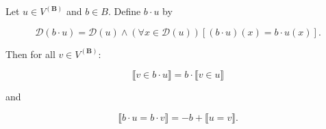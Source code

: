 Let $u \in V^{(\mathbf{B})}$ and $b \in B$. Define $b \cdot u$ by

$$\mathcal{D}(b \cdot u) = \mathcal{D}(u) \land (\forall x \in \mathcal{D}(u))[(b \cdot u)(x) = b \cdot u(x)].$$

Then for all $v \in V^{(\mathbf{B})}$:

$$\llbracket v \in b \cdot u \rrbracket = b \cdot \llbracket v \in u \rrbracket$$

and

$$\llbracket b \cdot u = b \cdot v \rrbracket = -b + \llbracket u = v \rrbracket.$$
